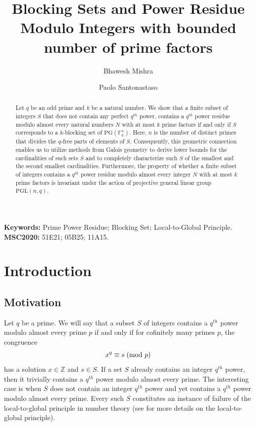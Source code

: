 \documentclass[12pt]{amsart}
\title[$k$-Blocking Sets and Power Residue]{Blocking Sets and Power Residue Modulo Integers with bounded number of prime factors}
\author[B. Mishra]{Bhawesh Mishra} \author[P. Santonastaso]{Paolo Santonastaso}
\date{}
\newcommand{\PG}{\mathrm{PG}}
\begin{document}
\begin{abstract}
Let $q$ be an odd prime and $k$ be a natural number. We show that a finite subset of integers $S$ that does not contain any perfect $q^{th}$ power, contains a $q^{th}$ power residue modulo almost every natural numbers $N$ with at most $k$ prime factors if and only if $S$ corresponds to a $k$-blocking set of $\PG(\mathbb{F}_{q}^{n})$. Here, $n$ is the number of distinct primes that divides the $q$-free parts of elements of $S$. 
Consequently, this geometric connection enables us to utilize methods from Galois geometry to derive lower bounds for the cardinalities of such sets $S$ and to completely characterize such $S$ of the smallest and the second smallest cardinalities. Furthermore, the property of whether a finite subset of integers contains a $q^{th}$ power residue modulo almost every integer $N$ with at most $k$ prime factors is invariant under the action of projective general linear group $\mathrm{PGL}(n, q)$.
\end{abstract}




\maketitle


\noindent
\textbf{Keywords:} Prime Power Residue; Blocking Set; Local-to-Global Principle.\\
\textbf{MSC2020:}  51E21; 05B25; 11A15.

\section{Introduction}

\subsection{Motivation}
Let $q$ be a prime. We will say that a subset $S$ of integers contains a $q^{th}$ power modulo almost every prime $p$ if and only if for cofinitely many primes $p$, the congruence \[x^{q} \equiv s \hspace{1mm} (\text{mod } p)\] has a solution $x \in\mathbb{Z}$ and $s \in S$. If a set $S$ already contains an integer $q^{th}$ power, then it trivially contains a $q^{th}$ power modulo almost every prime. The interesting case is when $S$ does not contain an integer $q^{th}$ power and yet contains a $q^{th}$ power modulo almost every prime. Every such $S$ constitutes an instance of failure of the local-to-global principle in number theory (see \cite[pp. 99-108]{Gou} for more details on the local-to-global principle).
\end{document}
